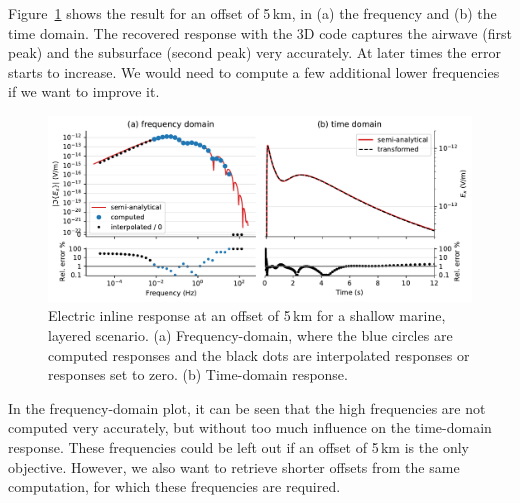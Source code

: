 \documentclass[extra, camera,%
    referee,     %
]{gji}
\newlength{\fwidth}
\begin{document}
Figure~\ref{fig:marine} shows the result for an offset of 5\,km, in (a) the
frequency and (b) the time domain. The recovered response with the 3D code
captures the airwave (first peak) and the subsurface (second peak) very
accurately. At later times the error starts to increase. We would need to
compute a few additional lower frequencies if we want to improve it.
%
\begin{figure}
  \centering
  \includegraphics[width=\fwidth]{06-marine}
  \caption{Electric inline response at an offset of 5\,km for a shallow marine,
    layered scenario. (a) Frequency-domain, where the blue circles are computed
    responses and the black dots are interpolated responses or responses set to
    zero. (b) Time-domain response.}
  \label{fig:marine}
\end{figure}
%
In the frequency-domain plot, it can be seen that the high frequencies are not
computed very accurately, but without too much influence on the time-domain
response. These frequencies could be left out if an offset of 5\,km is the only
objective. However, we also want to retrieve shorter offsets from the same
computation, for which these frequencies are required.
\end{document}
